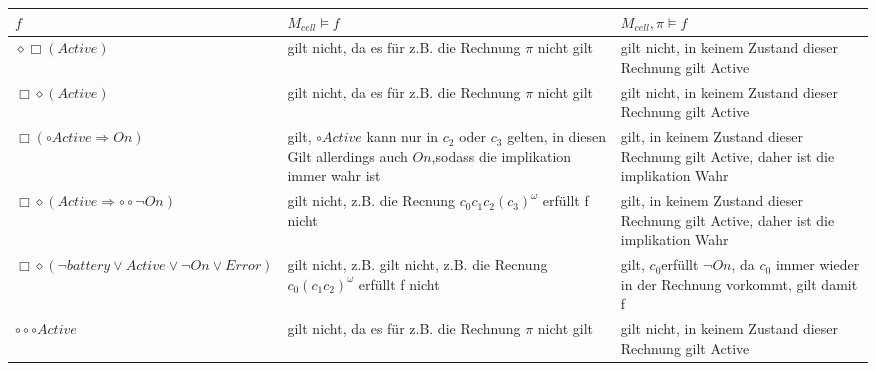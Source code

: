 \begin{tabular}{p{3cm}|p{6cm}|p{6cm}}


$f$ & $M_{cell} \models f $&$ M_{cell},\pi \models f$ \\
\hline
$\diamond\Box (Active)$ & gilt nicht, da es für z.B. die Rechnung $\pi$ nicht gilt&gilt nicht, in keinem Zustand dieser Rechnung gilt Active
\\
$\Box\diamond (Active)$ & gilt nicht, da es für z.B. die Rechnung $\pi$ nicht gilt&gilt nicht, in keinem Zustand dieser Rechnung gilt Active
\\
$\Box(\circ Active \Rightarrow On)$ & gilt, $\circ Active$ kann nur in $c_2$ oder $c_3$ gelten, in diesen Gilt allerdings auch $On$,sodass die implikation immer wahr ist&gilt, in keinem Zustand dieser Rechnung gilt Active, daher ist die implikation Wahr
\\
$\Box\diamond ( Active \Rightarrow \circ\circ\neg On)$ &gilt nicht, z.B. die Recnung $c_0c_1c_2(c_3)^\omega$ erfüllt f nicht&gilt, in keinem Zustand dieser Rechnung gilt Active, daher ist die implikation Wahr
\\
$\Box\diamond ( \neg battery \vee Active \vee \neg On \vee Error)$&gilt nicht, z.B. gilt nicht, z.B. die Recnung $c_0(c_1c_2)^\omega$ erfüllt f nicht & gilt, $c_0$erfüllt $\neg On$, da $c_0$ immer wieder in der Rechnung vorkommt, gilt damit f
\\
$\circ\circ\circ Active$&gilt nicht, da es für z.B. die Rechnung $\pi$ nicht gilt&gilt nicht, in keinem Zustand dieser Rechnung gilt Active
\end{tabular}